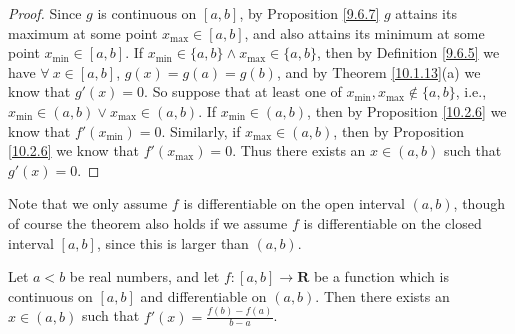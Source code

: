 \begin{proof}
    Since \(g\) is continuous on \([a, b]\), by Proposition \ref{9.6.7} \(g\) attains its maximum at some point \(x_{\max} \in [a, b]\), and also attains its minimum at some point \(x_{\min} \in [a, b]\).
    If \(x_{\min} \in \{a, b\} \land x_{\max} \in \{a, b\}\), then by Definition \ref{9.6.5} we have \(\forall\ x \in [a, b]\), \(g(x) = g(a) = g(b)\), and by Theorem \ref{10.1.13}(a) we know that \(g'(x) = 0\).
    So suppose that at least one of \(x_{\min}, x_{\max} \notin \{a, b\}\), i.e., \(x_{\min} \in (a, b) \lor x_{\max} \in (a, b)\).
    If \(x_{\min} \in (a, b)\), then by Proposition \ref{10.2.6} we know that \(f'(x_{\min}) = 0\).
    Similarly, if \(x_{\max} \in (a, b)\), then by Proposition \ref{10.2.6} we know that \(f'(x_{\max}) = 0\).
    Thus there exists an \(x \in (a, b)\) such that \(g'(x) = 0\).
\end{proof}

\begin{remark}\label{10.2.8}
    Note that we only assume \(f\) is differentiable on the open interval \((a, b)\), though of course the theorem also holds if we assume \(f\) is differentiable on the closed interval \([a, b]\), since this is larger than \((a, b)\).
\end{remark}

\begin{corollary}\label{10.2.9}
    Let \(a < b\) be real numbers, and let \(f : [a, b] \to \mathbf{R}\) be a function which is continuous on \([a, b]\) and differentiable on \((a, b)\).
    Then there exists an \(x \in (a, b)\) such that \(f'(x) = \frac{f(b) - f(a)}{b - a}\).
\end{corollary}

